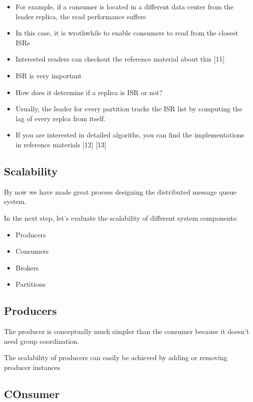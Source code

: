 \documentclass{report}
\theoremstyle{definition}
\let\oldsubsection\subsection
\renewcommand{\subsection}{\oldsubsection*}
\begin{document}
\begin{itemize}
\item
For example, if a consumer is located in a different data center from the leader replica, the read performance suffers
\item
In this case, it is wrothwhile to enable consumers to read from the closest ISRs
\item
Interested readers can checkout the reference material about this [11]
\item
ISR is very important
\item
How does it determine if a replica is ISR or not?
\item
Usually, the leader for every partition tracks the ISR list by computing the lag of every replca from itself.
\item
If you are interested in detailed algoriths, you can find the implementations in reference materials [12] [13]
\end{itemize}

\subsection{Scalability}

By now we have made great process designing the distributed message queue system.

In the next step, let's evaluate the scalability of different system components:

\begin{itemize}
\item
Producers
\item
Consumers
\item
Brokers
\item
Partitions
\end{itemize}

\subsection{Producers}

The producer is conceptually much simpler than the consumer because it doesn't need group coordination.

The scalability of producers can easily be achieved by adding or removing producer instances

\subsection{COnsumer}
\end{document}
